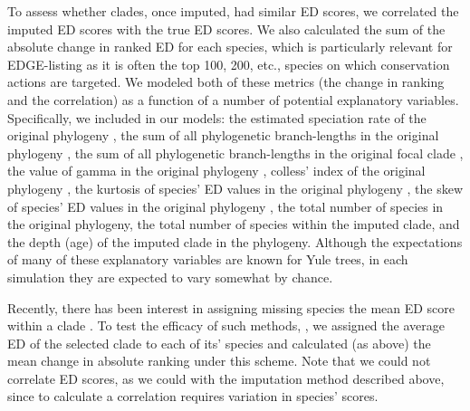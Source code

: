 \documentclass[12pt,english]{article}
\begin{document}
To assess whether clades, once imputed, had similar ED scores, we correlated the
imputed ED scores with the true ED scores. We also calculated the sum of the
absolute change in ranked ED for each species, which is particularly relevant
for EDGE-listing as it is often the top 100, 200, etc., species on which
conservation actions are targeted. We modeled both of these metrics (the change
in ranking and the correlation) as a function of a number of potential
explanatory variables. Specifically, we included in our models: the estimated speciation rate of the
original phylogeny \autocite[using \texttt{ape::yule};][]{Paradis2004}, the sum
of all phylogenetic branch-lengths in the original phylogeny \autocite[Faith's
PD;][]{Faith1992}, the sum of all phylogenetic branch-lengths in the original
focal clade \autocite[Faith's PD;][]{Faith1992}, the value of gamma in the
original phylogeny \autocite[using \texttt{phytools::gammatest};][]{Pybus2000,
Revell2012}, colless' index of the original phylogeny
\autocite[using\texttt{apTreeshape::as.treeshape};][]{Colless1982,
Bortolussi2009}, the kurtosis of species' ED values in the original phylogeny
\autocite[using \texttt{moments::kurtosis};][]{Komsta2015}, the skew of species'
ED values in the original phylogeny \autocite[using
\texttt{moments::skew};][]{Komsta2015}, the total number of species in the
original phylogeny, the total number of species within the imputed clade, and the depth (age) of the imputed clade in the phylogeny.
Although the expectations of many of these explanatory variables are known for
Yule trees, in each simulation they are expected to vary somewhat by chance.

Recently, there has been interest in assigning missing species the
mean ED score within a clade \autocite[see][]{Gumbs2017}. To test the
efficacy of such methods, , we assigned the average ED of the selected
clade to each of its' species and calculated (as above) the mean
change in absolute ranking under this scheme. Note that we could not
correlate ED scores, as we could with the imputation method described
above, since to calculate a correlation requires variation in species'
scores.
\end{document}
